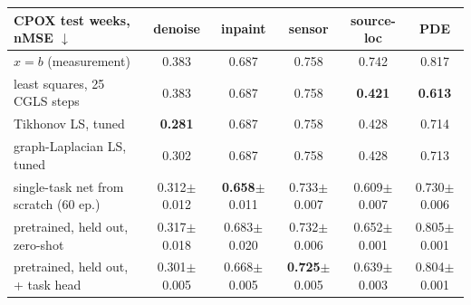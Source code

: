 \begin{tabular}{lccccc}
\toprule
CPOX test weeks, nMSE $\downarrow$ & denoise & inpaint & sensor & source-loc & PDE \\
\midrule
$x = b$ (measurement) & 0.383 & 0.687 & 0.758 & 0.742 & 0.817 \\
least squares, 25 CGLS steps & 0.383 & 0.687 & 0.758 & \textbf{0.421} & \textbf{0.613} \\
Tikhonov LS, tuned & \textbf{0.281} & 0.687 & 0.758 & 0.428 & 0.714 \\
graph-Laplacian LS, tuned & 0.302 & 0.687 & 0.758 & 0.428 & 0.713 \\
single-task net from scratch (60 ep.) & 0.312{\scriptsize$\pm$0.012} & \textbf{0.658}{\scriptsize$\pm$0.011} & 0.733{\scriptsize$\pm$0.007} & 0.609{\scriptsize$\pm$0.007} & 0.730{\scriptsize$\pm$0.006} \\
\midrule
pretrained, held out, zero-shot & 0.317{\scriptsize$\pm$0.018} & 0.683{\scriptsize$\pm$0.020} & 0.732{\scriptsize$\pm$0.006} & 0.652{\scriptsize$\pm$0.001} & 0.805{\scriptsize$\pm$0.001} \\
pretrained, held out, + task head & 0.301{\scriptsize$\pm$0.005} & 0.668{\scriptsize$\pm$0.005} & \textbf{0.725}{\scriptsize$\pm$0.005} & 0.639{\scriptsize$\pm$0.003} & 0.804{\scriptsize$\pm$0.001} \\
\bottomrule
\end{tabular}
